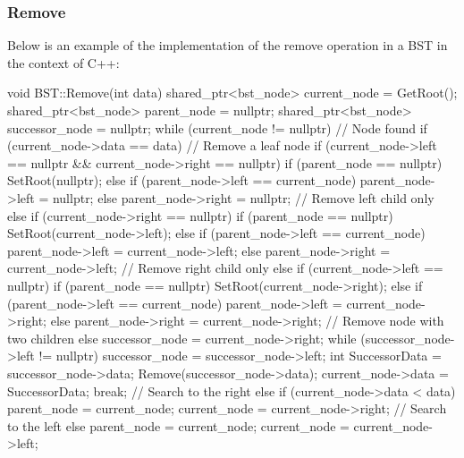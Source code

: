 \begin{highlight}

\subsubsection*{Remove}

Below is an example of the implementation of the remove operation in a BST in the context of C++:

\begin{code}
void BST::Remove(int data) {
shared_ptr<bst_node> current_node = GetRoot();
shared_ptr<bst_node> parent_node = nullptr;
shared_ptr<bst_node> successor_node = nullptr;
while (current_node != nullptr) {
    // Node found
    if (current_node->data == data) {
        // Remove a leaf node
        if (current_node->left == nullptr && current_node->right == nullptr) {
            if (parent_node == nullptr) {
                SetRoot(nullptr);
            }
            else if (parent_node->left == current_node) {
                parent_node->left = nullptr;
            }
            else {
                parent_node->right = nullptr;
            }
        }
        // Remove left child only
        else if (current_node->right == nullptr) {
            if (parent_node == nullptr) {
                SetRoot(current_node->left);
            }
            else if (parent_node->left == current_node) {
                parent_node->left = current_node->left;
            }
            else {
                parent_node->right = current_node->left;
            }
        }
        // Remove right child only
        else if (current_node->left == nullptr) {
            if (parent_node == nullptr) {
                SetRoot(current_node->right);
            }
            else if (parent_node->left == current_node) {
                parent_node->left = current_node->right;
            }
            else {
                parent_node->right = current_node->right;
            }
        }
        // Remove node with two children
        else {
            successor_node = current_node->right;
            while (successor_node->left != nullptr) {
                successor_node = successor_node->left;
            }
            int SuccessorData = successor_node->data;
            Remove(successor_node->data);
            current_node->data = SuccessorData;
        }
        break;
    }
        // Search to the right
        else if (current_node->data < data) {
            parent_node = current_node;
            current_node = current_node->right;
        }
        // Search to the left
        else {
            parent_node = current_node;
            current_node = current_node->left;
        }
    }
}
\end{code}


\end{highlight}
